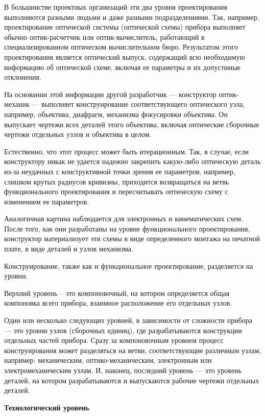 В большинстве проектных организаций эти два уровня проектирования выполняются разными людьми и даже разными подразделениями. Так, например, проектирование оптической системы (оптической схемы) прибора выполняет обычно оптик-расчетчик или оптик-вычислитель, работающий в специализированном оптическом вычислительном бюро. Результатом этого проектирования является оптический выпуск, содержащий всю необходимую информацию об оптической схеме, включая ее параметры и их допустимые отклонения. 

На основании этой информации другой разработчик --- конструктор оптик-механик --- выполняет конструирование соответствующего оптического узла, например, объектива, диафрагм, механизма фокусировки объектива. Он выпускает чертежи всех деталей этого объектива, включая оптические сборочные чертежи отдельных узлов и объектива в целом.

Естественно, что этот процесс может быть итерационным. Так, в случае, если конструктору никак не удается надежно закрепить какую-либо оптическую деталь из-за неудачных с конструктивной точки зрения ее параметров, например, слишком крутых радиусов кривизны, приходится возвращаться на ветвь функционального проектирования и пересчитывать оптическую схему с изменением ее параметров.

Аналогичная картина наблюдается для электронных и кинематических схем. После того, как они разработаны на уровне функционального проектирования, конструктор материализует эти схемы в виде определенного монтажа на печатной плате, в виде деталей и узлов механизма.

Конструирование, также как и функциональное проектирование, разделяется на уровни.

Верхний уровень -- это компоновочный, на котором определяется общая компоновка всего прибора, взаимное расположение его отдельных узлов.

Один или несколько следующих уровней, в зависимости от сложности прибора --- это уровни узлов (сборочных единиц), где разрабатываются конструкции отдельных частей прибора. Сразу за компоновочным уровнем процесс конструирования может разделяться на ветви, соответствующие различным узлам, например: механическим, оптико-механическим, электронным или электромеханическим узлам. И, наконец, последний уровень --- это уровень деталей, на котором разрабатываются и выпускаются рабочие чертежи отдельных деталей.

\newpage
\begin{flushleft}
	\textbf{Технологический уровень}
\end{flushleft}

